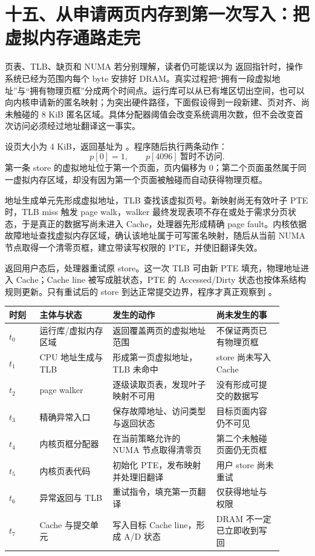 \section{十五、从申请两页内存到第一次写入：把虚拟内存通路走完}

页表、TLB、缺页和 NUMA 若分别理解，读者仍可能误以为  返回指针时，操作系统已经为范围内每个 byte 安排好 DRAM。真实过程把“拥有一段虚拟地址”与“拥有物理页框”分成两个时间点。运行库可以从已有堆区切出空间，也可以向内核申请新的匿名映射；为突出硬件路径，下面假设得到一段新建、页对齐、尚未触碰的 8 KiB 匿名区域。具体分配器阈值会改变系统调用次数，但不会改变首次访问必须经过地址翻译这一事实。

设页大小为 4 KiB，返回基址为 。程序随后执行两条动作：
\[
  p[0]=1,\qquad p[4096]\ \text{暂时不访问}.
\]
第一条 store 的虚拟地址位于第一个页面，页内偏移为 0；第二个页面虽然属于同一虚拟内存区域，却没有因为第一个页面被触碰而自动获得物理页框。


地址生成单元先形成虚拟地址，TLB 查找该虚拟页号。新映射尚无有效叶子 PTE 时，TLB miss 触发 page walk，walker 最终发现表项不存在或处于需求分页状态，于是真正的数据写尚未进入 Cache，处理器先形成精确 page fault。内核依据故障地址查找虚拟内存区域，确认该地址属于可写匿名映射，随后从当前 NUMA 节点取得一个清零页框，建立带读写权限的 PTE，并使旧翻译失效。

返回用户态后，处理器重试原 store。这一次 TLB 可由新 PTE 填充，物理地址进入 Cache；Cache line 被写成脏状态，PTE 的 Accessed/Dirty 状态也按体系结构规则更新。只有重试后的 store 到达正常提交边界，程序才真正观察到 。

\begin{longtable}{L{0.10\linewidth}L{0.24\linewidth}L{0.34\linewidth}L{0.22\linewidth}}
\toprule
时刻 & 主体与状态 & 发生的动作 & 尚未发生的事 \\
\midrule
$t_0$ & 运行库/虚拟内存区域 & 返回覆盖两页的虚拟地址范围 & 不保证两页已有物理页框 \\\tablerowrule
$t_1$ & CPU 地址生成与 TLB & 形成第一页虚拟地址，TLB 未命中 & store 尚未写入 Cache \\\tablerowrule
$t_2$ & page walker & 逐级读取页表，发现叶子映射不可用 & 没有形成可提交的数据写 \\\tablerowrule
$t_3$ & 精确异常入口 & 保存故障地址、访问类型与返回状态 & 目标页面内容仍不可见 \\\tablerowrule
$t_4$ & 内核页框分配器 & 在当前策略允许的 NUMA 节点取得清零页 & 第二个未触碰页面仍无页框 \\\tablerowrule
$t_5$ & 内核页表代码 & 初始化 PTE，发布映射并处理旧翻译 & 用户 store 尚未重试 \\\tablerowrule
$t_6$ & 异常返回与 TLB & 重试指令，填充第一页翻译 & 仅获得地址与权限 \\\tablerowrule
$t_7$ & Cache 与提交单元 & 写入目标 Cache line，形成 A/D 状态 & DRAM 不一定已立即收到写回 \\
\bottomrule
\end{longtable}

